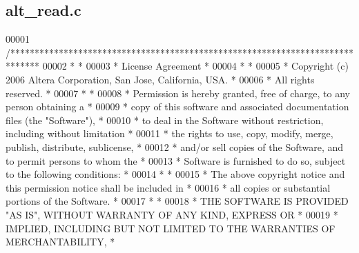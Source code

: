 \subsection{alt\+\_\+read.\+c}
\label{alt__read_8c_source}

\begin{DoxyCode}
00001 \textcolor{comment}{/******************************************************************************}
00002 \textcolor{comment}{*                                                                             *}
00003 \textcolor{comment}{* License Agreement                                                           *}
00004 \textcolor{comment}{*                                                                             *}
00005 \textcolor{comment}{* Copyright (c) 2006 Altera Corporation, San Jose, California, USA.           *}
00006 \textcolor{comment}{* All rights reserved.                                                        *}
00007 \textcolor{comment}{*                                                                             *}
00008 \textcolor{comment}{* Permission is hereby granted, free of charge, to any person obtaining a     *}
00009 \textcolor{comment}{* copy of this software and associated documentation files (the "Software"),  *}
00010 \textcolor{comment}{* to deal in the Software without restriction, including without limitation   *}
00011 \textcolor{comment}{* the rights to use, copy, modify, merge, publish, distribute, sublicense,    *}
00012 \textcolor{comment}{* and/or sell copies of the Software, and to permit persons to whom the       *}
00013 \textcolor{comment}{* Software is furnished to do so, subject to the following conditions:        *}
00014 \textcolor{comment}{*                                                                             *}
00015 \textcolor{comment}{* The above copyright notice and this permission notice shall be included in  *}
00016 \textcolor{comment}{* all copies or substantial portions of the Software.                         *}
00017 \textcolor{comment}{*                                                                             *}
00018 \textcolor{comment}{* THE SOFTWARE IS PROVIDED "AS IS", WITHOUT WARRANTY OF ANY KIND, EXPRESS OR  *}
00019 \textcolor{comment}{* IMPLIED, INCLUDING BUT NOT LIMITED TO THE WARRANTIES OF MERCHANTABILITY,    *}

\end{DoxyCode}
